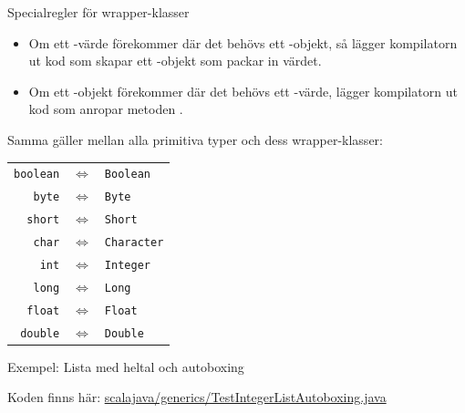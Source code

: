 \begin{Slide}{Specialregler för wrapper-klasser}\SlideFontSmall

\begin{itemize}
\item Om ett -värde förekommer där det behövs ett -objekt, så lägger kompilatorn  ut kod som skapar ett -objekt som packar in värdet.
\item Om ett -objekt förekommer där det behövs ett -värde, lägger kompilatorn  ut kod som anropar metoden .
\end{itemize}
Samma gäller mellan alla primitiva typer och dess wrapper-klasser:

\begin{tabular}{r c l}
 {\lstinline!boolean!} &$\Leftrightarrow$& {\lstinline!Boolean!} \\
 {\lstinline!byte!} &$\Leftrightarrow$& {\lstinline!Byte!}\\
 {\lstinline!short!}&$\Leftrightarrow$& {\lstinline!Short!}\\
 {\lstinline!char!} &$\Leftrightarrow$& {\lstinline!Character!}\\
 {\lstinline!int!} &$\Leftrightarrow$& {\lstinline!Integer!}\\
 {\lstinline!long!} &$\Leftrightarrow$& {\lstinline!Long!}\\
 {\lstinline!float!} &$\Leftrightarrow$& {\lstinline!Float!}\\
 {\lstinline!double!} &$\Leftrightarrow$&{\lstinline!Double!}\\
\end{tabular}

\end{Slide}






\begin{Slide}{Exempel: Lista med heltal och autoboxing}

\SlideFontTiny Koden finns här: \href{https://github.com/lunduniversity/introprog/tree/master/compendium/examples/scalajava/generics/TestIntegerList.java}{scalajava/generics/TestIntegerListAutoboxing.java}
\end{Slide}

